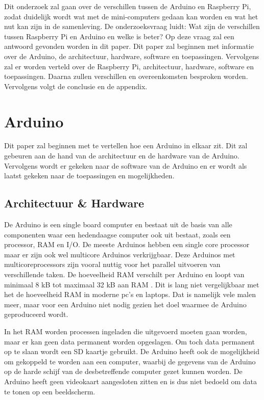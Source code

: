 \documentclass[a4paper, dutch, abstract=true]{scrartcl}
\begin{document}
Dit onderzoek zal gaan over de verschillen tussen de Arduino en Raspberry Pi, zodat duidelijk wordt
wat met de mini-computers gedaan kan worden en wat het nut kan zijn in de samenleving.
De onderzoeksvraag luidt: Wat zijn de verschillen tussen Raspberry Pi en Arduino en welke is beter?
Op deze vraag zal een antwoord gevonden worden in dit paper.
Dit paper zal beginnen met informatie over de Arduino, de architectuur, hardware, software en
toepassingen.
Vervolgens zal er worden verteld over de Raspberry Pi, architectuur, hardware, software en
toepassingen.
Daarna zullen verschillen en overeenkomsten besproken worden.
Vervolgens volgt de conclusie en de appendix.

\section{Arduino}
Dit paper zal beginnen met te vertellen hoe een Arduino in elkaar zit.
Dit zal gebeuren aan de hand van de architectuur en de hardware van de Arduino.
Vervolgens wordt er gekeken naar de software van de Arduino en er wordt als laatst gekeken naar de
toepassingen en mogelijkheden.

\subsection{Architectuur \& Hardware}
De Arduino is een single board computer en bestaat uit de basis van alle componenten waar een
hedendaagse computer ook uit bestaat, zoals een processor, RAM en I/O.
De meeste Arduinos hebben een single core processor maar er zijn ook wel multicore Arduinos
verkrijgbaar.
Deze Arduinos met multicoreprocessors zijn vooral nuttig voor het parallel uitvoeren van
verschillende taken.
De hoeveelheid RAM verschilt per Arduino en loopt van minimaal 8 kB tot maximaal 32 kB aan RAM
\cite{arduino2019products}.
Dit is lang niet vergelijkbaar met het de hoeveelheid RAM in moderne pc's en laptops.
Dat is namelijk vele malen meer, maar voor een Arduino niet nodig gezien het doel waarmee de Arduino
geproduceerd wordt.

In het RAM worden processen ingeladen die uitgevoerd moeten gaan worden, maar er kan geen data
permanent worden opgeslagen.
Om toch data permanent op te slaan wordt een SD kaartje gebruikt.
De Arduino heeft ook de mogelijkheid om gekoppeld te worden aan een computer, waarbij de gegevens
van de Arduino op de harde schijf van de desbetreffende computer gezet kunnen worden.
De Arduino heeft geen videokaart aangesloten zitten en is dus niet bedoeld om data te tonen op een
beeldscherm.
\end{document}
